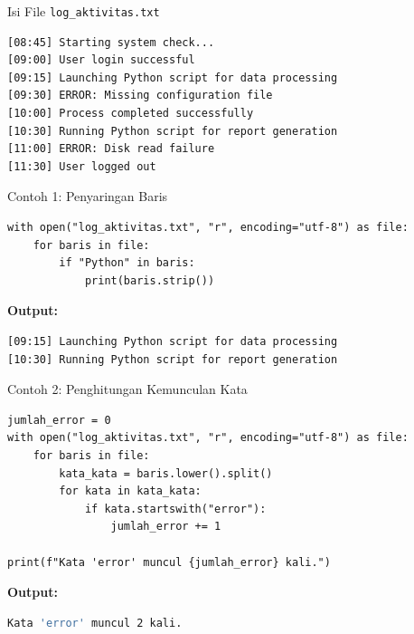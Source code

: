 \documentclass[aspectratio=169, table]{beamer}
\begin{document}
\begin{frame}[fragile]{Isi File \texttt{log\_aktivitas.txt}}
\vspace{20pt}
\begin{lstlisting}[language=bash, caption={Cuplikan isi file log_aktivitas.txt}]
[08:45] Starting system check...
[09:00] User login successful
[09:15] Launching Python script for data processing
[09:30] ERROR: Missing configuration file
[10:00] Process completed successfully
[10:30] Running Python script for report generation
[11:00] ERROR: Disk read failure
[11:30] User logged out
\end{lstlisting}
\end{frame}

\begin{frame}[fragile]{Contoh 1: Penyaringan Baris}
\vspace{20pt}
\begin{lstlisting}[style=PythonStyle, caption={Menyaring baris yang mengandung kata "Python"}]
with open("log_aktivitas.txt", "r", encoding="utf-8") as file:
    for baris in file:
        if "Python" in baris:
            print(baris.strip())
\end{lstlisting}

\noindent\textbf{Output:}
\begin{lstlisting}[language=bash, caption={Hasil penyaringan baris yang mengandung "Python"}]
[09:15] Launching Python script for data processing
[10:30] Running Python script for report generation
\end{lstlisting}
\end{frame}

\begin{frame}[fragile]{Contoh 2: Penghitungan Kemunculan Kata}
\vspace{20pt}
\begin{lstlisting}[style=PythonStyle, caption={Menghitung kemunculan kata "error"}]
jumlah_error = 0
with open("log_aktivitas.txt", "r", encoding="utf-8") as file:
    for baris in file:
        kata_kata = baris.lower().split()
        for kata in kata_kata:
            if kata.startswith("error"):
                jumlah_error += 1

print(f"Kata 'error' muncul {jumlah_error} kali.")
\end{lstlisting}

\noindent\textbf{Output:}
\begin{lstlisting}[language=bash, caption={Hasil penghitungan kemunculan kata "error"}]
Kata 'error' muncul 2 kali.
\end{lstlisting}
\end{frame}
\end{document}
